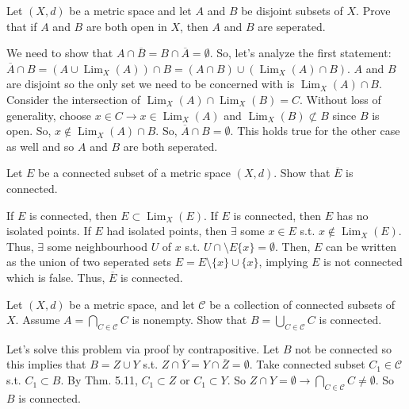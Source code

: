 \documentclass[12pt,letterpaper,boxed]{hmcpset}
\DeclareMathOperator{\Lim}{Lim}
\begin{document}
\begin{problem}[Exercise 5.7]
Let $(X, d)$ be a metric space and let $A$ and $B$ be disjoint subsets of $X$. Prove that if $A$ and $B$ are both open in $X$, then $A$ and $B$ are seperated.
\end{problem}

\begin{solution}
We need to show that $A \cap \overline{B} = B \cap \overline{A} = \emptyset.$ So, let's analyze the first statement: $\overline{A}\cap B = (A \cup \Lim_{X}(A))\cap B = (A \cap B)\cup(\Lim_{X}(A) \cap B).$ $A$ and $B$ are disjoint so the only set we need to be concerned with is $\Lim_{X}(A) \cap B$. Consider the intersection of $\Lim_X(A)\cap \Lim_X(B) = C.$ Without loss of generality, choose $x \in C \rightarrow x \in \Lim_X(A)$ and $\Lim_X(B)\not \subset B$ since $B$ is open. So, $x \notin \Lim_X(A)\cap B.$ So, $\overline{A}\cap B = \emptyset$. This holds true for the other case as well and so $A$ and $B$ are both seperated.  
\end{solution}

\begin{problem}[Exercise 5.8]
Let $E$ be a connected subset of a metric space $(X, d)$. Show that $\overline{E}$ is connected.
\end{problem}

\begin{solution}
If $E$ is connected, then $E \subset \Lim_X (E)$. If $E$ is connected, then $E$ has no isolated points. If $E$ had isolated points, then $\exists$ some $x\in E$ s.t. $x \notin \Lim_X (E)$. Thus, $\exists$ some neighbourhood $U$ of $x$ s.t. $U\cap\setminus E\{x\} = \emptyset.$ Then, $E$ can be written as the union of two seperated sets $E = E\setminus \{x\}\cup \{x\}$, implying $E$ is not connected which is false. Thus, $\overline{E}$ is connected. 
\end{solution}

\begin{problem}[Exercise 5.12]
Let $(X,d)$ be a metric space, and let $\mathcal{C}$ be a collection of connected subsets of $X$. Assume $A = \bigcap_{C \in \mathcal{C}} C$ is nonempty. Show that $B = \bigcup_{C \in \mathcal{C}} C$ is connected.
\end{problem}

\begin{solution}
 Let's solve this problem via proof by contrapositive. Let $B$ not be connected so this implies that $B=Z\cup Y$ s.t. $Z \cap \overline{Y}=Y \cap \overline{Z} = \emptyset.$ Take connected subset $C_1 \in \mathcal{C}$ s.t. $C_1 \subset B$. By Thm. 5.11, $C_1 \subset Z$ or $C_1 \subset Y.$ So $Z \cap Y = \emptyset \rightarrow \bigcap_{C \in \mathcal{C}} C \neq \emptyset.$ So $B$ is connected.
\end{solution}
\end{document}

